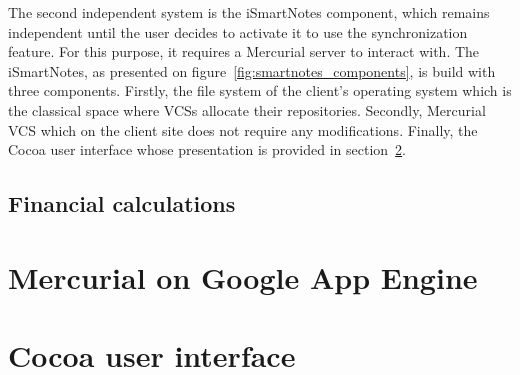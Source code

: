 The second independent system is the iSmartNotes component, which remains independent until the user decides to activate it to use the synchronization feature. For this purpose, it requires a Mercurial server to interact with. The iSmartNotes, as presented on figure~\ref{fig:smartnotes_components}, is build with three components. Firstly, the file system of the client's operating system which is the classical space where VCSs allocate their repositories. Secondly, Mercurial VCS which on the client site does not require any modifications. Finally, the Cocoa user interface whose presentation is provided in section~\ref{sec:cocoa}.

\subsection{Financial calculations}\label{subsec:gae_calculations}
\section{Mercurial on Google App Engine}\label{sec:hg_on_gae}
\section{Cocoa user interface}\label{sec:cocoa}